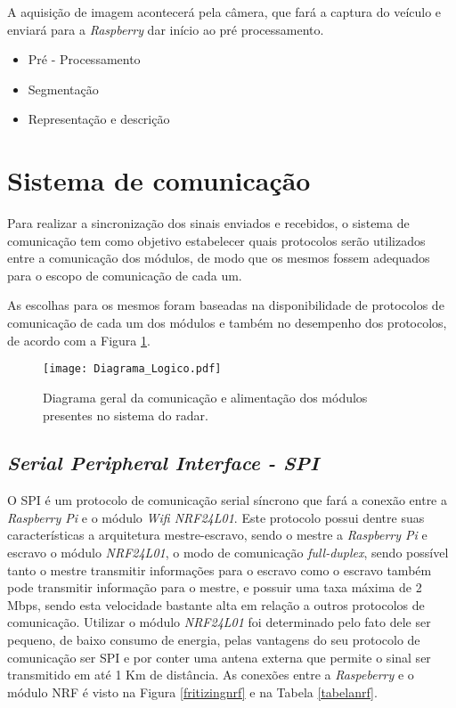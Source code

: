    A aquisição de imagem acontecerá pela câmera, que fará a captura do veículo e enviará para a \emph{Raspberry} dar início ao pré processamento.  
   
\begin{itemize}
    \item Pré - Processamento
    \item Segmentação
    \item Representação e descrição
\end{itemize}



\section{Sistema de comunicação}
Para realizar a sincronização dos sinais enviados e recebidos, o sistema de comunicação tem como objetivo estabelecer quais protocolos serão utilizados entre a comunicação dos módulos, de modo que os mesmos fossem adequados para o escopo de comunicação de cada um.

As escolhas para os mesmos foram baseadas na disponibilidade de protocolos  de comunicação de cada um dos módulos e também no desempenho dos protocolos, de acordo com a Figura \ref{diagrama_logico}.


\begin{figure}[H]
    \centering
    \texttt{[image: Diagrama\_Logico.pdf]}
    \caption{Diagrama geral da comunicação e alimentação dos módulos presentes no sistema do radar. }
    \label{diagrama_logico}
\end{figure}



\subsection{\emph{Serial Peripheral Interface - SPI}}
    O SPI é um protocolo de comunicação serial síncrono que fará a conexão entre a \emph{Raspberry Pi} e o módulo \emph{Wifi NRF24L01}. Este protocolo possui dentre suas características a arquitetura mestre-escravo, sendo o mestre a \emph{Raspberry Pi} e escravo o módulo \emph{NRF24L01}, o modo de comunicação \emph{full-duplex}, sendo possível tanto o mestre transmitir informações para o escravo como o escravo também pode transmitir informação para o mestre, e possuir uma taxa máxima de 2 Mbps, sendo esta velocidade bastante alta em relação a outros protocolos de comunicação.
    Utilizar o módulo \emph{NRF24L01} foi determinado pelo fato dele ser pequeno, de baixo consumo de energia, pelas vantagens do seu protocolo de comunicação ser SPI e por conter uma antena externa que permite o sinal ser transmitido em até 1 Km de distância.
    As conexões entre a \emph{Raspeberry} e o módulo NRF é visto na Figura \ref{fritizingnrf} e na Tabela \ref{tabelanrf}.
    
